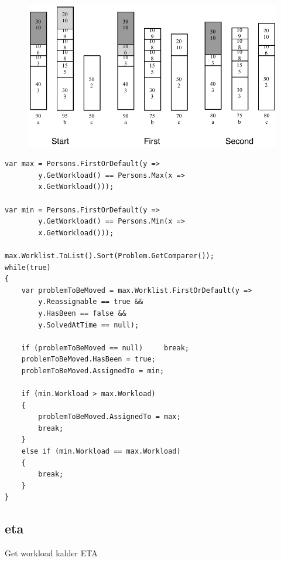 \begin{figure}
	\centering
		\includegraphics[scale=0.8]{input/implementation/key_points/balanceWorkloadDiagram.pdf}
	\label{fig:balanceWorkloadDiagram}
\end{figure}


\begin{lstlisting}[style=sourceCode, caption=\myCaption{A code snippet of the balance workload method. The presented code is within a for loop running each for every staff minus one}, label=lst:balanceWorkload]
var max = Persons.FirstOrDefault(y => 	
		y.GetWorkload() == Persons.Max(x => 
		x.GetWorkload()));                  

var min = Persons.FirstOrDefault(y => 
		y.GetWorkload() == Persons.Min(x => 
		x.GetWorkload()));
    
max.Worklist.ToList().Sort(Problem.GetComparer());             
while(true)
{
    var problemToBeMoved = max.Worklist.FirstOrDefault(y => 
		y.Reassignable == true && 
		y.HasBeen == false && 
		y.SolvedAtTime == null);
                   
    if (problemToBeMoved == null)     break; 
    problemToBeMoved.HasBeen = true;
    problemToBeMoved.AssignedTo = min;
    
    if (min.Workload > max.Workload)
    {
    	problemToBeMoved.AssignedTo = max;
    	break;
    }
    else if (min.Workload == max.Workload)
    {
		break;
    }
} 
\end{lstlisting}




\subsection{eta}
\label{}


Get workload kalder ETA